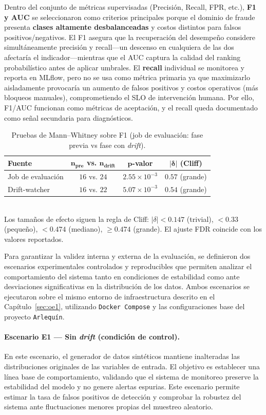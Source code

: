 Dentro del conjunto de métricas supervisadas (Precisión, Recall, FPR, etc.), \textbf{F1 y AUC} se seleccionaron como criterios principales porque el dominio de fraude presenta \textbf{clases altamente desbalanceadas} y costos distintos para falsos positivos/negativos. El F1 asegura que la recuperación del desempeño considere simultáneamente precisión y recall—un descenso en cualquiera de las dos afectaría el indicador—mientras que el AUC captura la calidad del ranking probabilístico antes de aplicar umbrales. El \textbf{recall} individual se monitorea y reporta en MLflow, pero no se usa como métrica primaria ya que maximizarlo aisladamente provocaría un aumento de falsos positivos y costos operativos (más bloqueos manuales), comprometiendo el SLO de intervención humana. Por ello, F1/AUC funcionan como métricas de aceptación, y el recall queda documentado como señal secundaria para diagnósticos.

\begin{table}[htbp]
\centering
\caption{Pruebas de Mann–Whitney sobre F1 (job de evaluación: fase previa vs fase con \textit{drift}).}
\label{tab:mw-tests}
\begin{tabular}{lccc}
\toprule
\textbf{Fuente} & $\boldsymbol{n_{\text{pre}}}$ vs. $\boldsymbol{n_{\text{drift}}}$ & $\boldsymbol{p}$-valor & $\boldsymbol{|\delta|}$ (Cliff) \\
\midrule
Job de evaluación  & $16$ vs. $24$ & $2.55\times10^{-3}$ & $0.57$ (grande) \\
Drift-watcher & $16$ vs. $22$ & $5.07\times10^{-3}$ & $0.54$ (grande) \\
\bottomrule
\end{tabular}
\\[2pt]
\footnotesize Los tamaños de efecto siguen la regla de Cliff: $|\delta|<0.147$ (trivial), $<0.33$ (pequeño), $<0.474$ (mediano), $\ge 0.474$ (grande). El ajuste FDR coincide con los valores reportados.
\end{table}


Para garantizar la validez interna y externa de la evaluación, se definieron dos escenarios experimentales controlados y reproducibles que permiten analizar el comportamiento del sistema tanto en condiciones de estabilidad como ante desviaciones significativas en la distribución de los datos. Ambos escenarios se ejecutaron sobre el mismo entorno de infraestructura descrito en el Capítulo~\ref{sec:oe1}, utilizando \texttt{Docker~Compose} y las configuraciones base del proyecto \texttt{Arlequín}.

\paragraph{Escenario E1 — Sin \textit{drift} (condición de control).}
En este escenario, el generador de datos sintéticos mantiene inalteradas las distribuciones originales de las variables de entrada. El objetivo es establecer una línea base de comportamiento, validando que el sistema de monitoreo preserve la estabilidad del modelo y no genere alertas espurias. Este escenario permite estimar la tasa de falsos positivos de detección y comprobar la robustez del sistema ante fluctuaciones menores propias del muestreo aleatorio.

